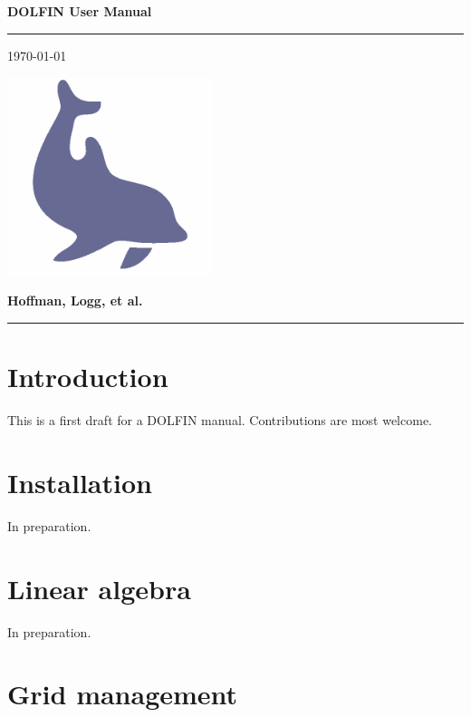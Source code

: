 \documentclass[12pt]{article}
\begin{document}

\thispagestyle{empty}

\Large
\textbf{DOLFIN User Manual} \\
\vspace{-0.5cm}
\hrule
\hfill
\small
\today

\vspace{3cm}

\begin{center}
\includegraphics[width=6cm]{eps/dolfin.eps}
\end{center}

\vfill

\normalsize
\textbf{Hoffman, Logg, et al.}
\hrule

\cleardoublepage


\tableofcontents
\newpage

\cleardoublepage
\section{Introduction}

This is a first draft for a DOLFIN manual. Contributions are most welcome.

\cleardoublepage
\section{Installation}

In preparation.

\cleardoublepage
\section{Linear algebra}

In preparation.

\cleardoublepage
\section{Grid management}
\end{document}
